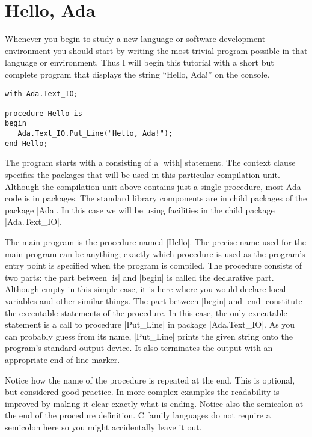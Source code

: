 \section{Hello, Ada}
\label{sec:hello-ada}

Whenever you begin to study a new language or software development environment you should start
by writing the most trivial program possible in that language or environment. Thus I will begin
this tutorial with a short but complete program that displays the string ``Hello, Ada!'' on the
console.

\label{lst:hello-ada}
\begin{lstlisting}
with Ada.Text_IO;

procedure Hello is
begin
   Ada.Text_IO.Put_Line("Hello, Ada!");
end Hello;
\end{lstlisting}

\noindent The program starts with a  consisting of a |with| statement.
The context clause specifies the packages that will be used in this particular compilation unit.
Although the compilation unit above contains just a single procedure, most Ada code is in
packages. The standard library components are in child packages of the package |Ada|. In this
case we will be using facilities in the child package |Ada.Text_IO|.

The main program is the procedure named |Hello|. The precise name used for the main program can
be anything; exactly which procedure is used as the program's entry point is specified when the
program is compiled. The procedure consists of two parts: the part between |is| and |begin| is
called the declarative part. Although empty in this simple case, it is here where you would
declare local variables and other similar things. The part between |begin| and |end| constitute
the executable statements of the procedure. In this case, the only executable statement is a
call to procedure |Put_Line| in package |Ada.Text_IO|. As you can probably guess from its name,
|Put_Line| prints the given string onto the program's standard output device. It also terminates
the output with an appropriate end-of-line marker.

Notice how the name of the procedure is repeated at the end. This is optional, but considered
good practice. In more complex examples the readability is improved by making it clear exactly
what is ending. Notice also the semicolon at the end of the procedure definition. C family
languages do not require a semicolon here so you might accidentally leave it out.

